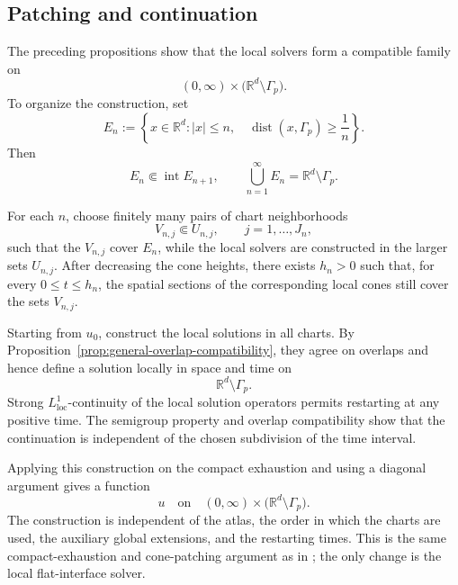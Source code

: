 \documentclass[11pt]{amsart}
\numberwithin{equation}{section}
\theoremstyle{plain}
\theoremstyle{definition}
\theoremstyle{remark}
\begin{document}
\subsection{Patching and continuation}
\label{subsec:general-patching}

The preceding propositions show that the local solvers form a compatible
family on
\[
    (0,\infty)
    \times
    \bigl(\mathbb R^d\setminus\Gamma_p\bigr).
\]
To organize the construction, set
\begin{equation}
\label{eq:general-compact-exhaustion}
    E_n
    :=
    \left\{
        x\in\mathbb R^d:
        |x|\le n,
        \quad
        \operatorname{dist}(x,\Gamma_p)\ge\frac1n
    \right\}.
\end{equation}
Then
\[
    E_n\Subset\operatorname{int}E_{n+1},
    \qquad
    \bigcup_{n=1}^\infty E_n
    =
    \mathbb R^d\setminus\Gamma_p.
\]

For each \(n\), choose finitely many pairs of chart neighborhoods
\[
    V_{n,j}\Subset U_{n,j},
    \qquad
    j=1,\ldots,J_n,
\]
such that the \(V_{n,j}\) cover \(E_n\), while the local solvers are
constructed in the larger sets \(U_{n,j}\). After decreasing the cone
heights, there exists \(h_n>0\) such that, for every
\(0\le t\le h_n\), the spatial sections of the corresponding local cones
still cover the sets \(V_{n,j}\).

Starting from \(u_0\), construct the local solutions in all charts. By
Proposition~\ref{prop:general-overlap-compatibility}, they agree on overlaps
and hence define a solution locally in space and time on
\[
    \mathbb R^d\setminus\Gamma_p.
\]
Strong \(L^1_{\mathrm{loc}}\)-continuity of the local solution operators
permits restarting at any positive time. The semigroup property and overlap
compatibility show that the continuation is independent of the chosen
subdivision of the time interval.

Applying this construction on the compact exhaustion and using a diagonal
argument gives a function
\begin{equation}
\label{eq:general-solution-away-singular-set}
    u
    \quad\text{on}\quad
    (0,\infty)
    \times
    \bigl(\mathbb R^d\setminus\Gamma_p\bigr).
\end{equation}
The construction is independent of the atlas, the order in which the charts
are used, the auxiliary global extensions, and the restarting times. This is
the same compact-exhaustion and cone-patching argument as in
\cite[Section~2]{Mitrovic2025Nondegenerate}; the only change is the local
flat-interface solver.
\end{document}
